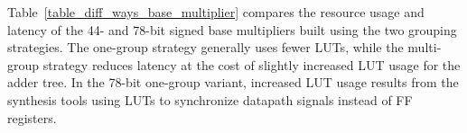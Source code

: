 \documentclass[conference]{IEEEtran}
\begin{document}
Table~\ref{table_diff_ways_base_multiplier} compares the resource usage and latency of the 44- and 78-bit signed base multipliers built using the two grouping strategies.
The one-group strategy generally uses fewer LUTs, while the multi-group strategy reduces latency at the cost of slightly increased LUT usage for the adder tree.
In the 78-bit one-group variant, increased LUT usage results from the synthesis tools using LUTs to synchronize datapath signals instead of FF registers.

\begin{table}[bt]
\centering
\caption{Comparison of different base multiplier strategies.}
\label{table_diff_ways_base_multiplier}
\end{table}





\end{document}
